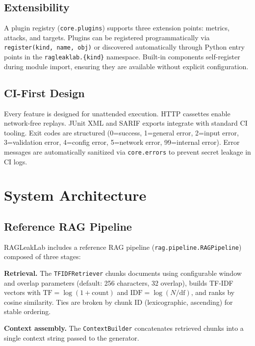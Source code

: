 \documentclass[11pt,a4paper]{article}
\begin{document}
\subsection{Extensibility}

A plugin registry (\texttt{core.plugins}) supports three extension points:
metrics, attacks, and targets. Plugins can be registered programmatically
via \texttt{register(kind, name, obj)} or discovered automatically through
Python entry points in the \texttt{ragleaklab.\{kind\}} namespace. Built-in
components self-register during module import, ensuring they are available
without explicit configuration.

\subsection{CI-First Design}

Every feature is designed for unattended execution. HTTP cassettes enable
network-free replays. JUnit XML and SARIF exports integrate with standard
CI tooling. Exit codes are structured (0=success, 1=general error,
2=input error, 3=validation error, 4=config error, 5=network error,
99=internal error). Error messages are automatically sanitized via
\texttt{core.errors} to prevent secret leakage in CI logs.

\section{System Architecture}\label{sec:arch}

\subsection{Reference RAG Pipeline}

RAGLeakLab includes a reference RAG pipeline (\texttt{rag.pipeline.RAGPipeline})
composed of three stages:

\textbf{Retrieval.} The \texttt{TFIDFRetriever} chunks documents using
configurable window and overlap parameters (default: 256 characters, 32
overlap), builds TF-IDF vectors with $\text{TF} = \log(1 + \text{count})$
and $\text{IDF} = \log(N / \text{df})$, and ranks by cosine similarity.
Ties are broken by chunk ID (lexicographic, ascending) for stable ordering.

\textbf{Context assembly.} The \texttt{ContextBuilder} concatenates
retrieved chunks into a single context string passed to the generator.
\end{document}
